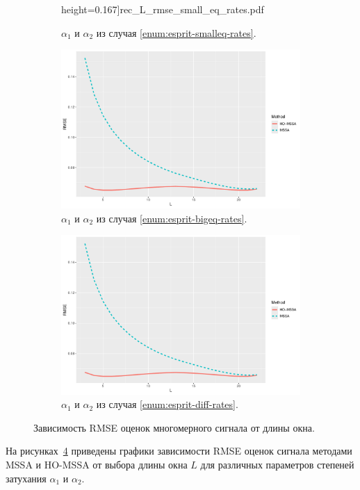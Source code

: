 \documentclass[specialist,
  substylefile=spbu_report.rtx,
subf,href,colorlinks=true, 12pt]{disser}
\theoremstyle{plain}
\theoremstyle{definition}
\theoremstyle{remark}
\begin{document}
\begin{figure}
\begin{subfigure}{0.49\linewidth}
    height=0.167\textheight]{rec_L_rmse_small_eq_rates.pdf}
    \caption{$\alpha_1$ и $\alpha_2$ из случая
    \ref{enum:esprit-smalleq-rates}.}
    \label{fig:L_rmse_smalleq_rates}
  \end{subfigure}
  \begin{subfigure}{0.49\linewidth}
    \includegraphics[width=\linewidth,
    height=0.167\textheight]{rec_L_rmse_large_eq_rates.pdf}
    \caption{$\alpha_1$ и $\alpha_2$ из случая \ref{enum:esprit-bigeq-rates}.}
    \label{fig:L_rmse_bigeq_rates}
  \end{subfigure}
  \begin{subfigure}{0.49\linewidth}
    \includegraphics[width=\linewidth,
    height=0.167\textheight]{rec_L_rmse.pdf}
    \caption{$\alpha_1$ и $\alpha_2$ из случая \ref{enum:esprit-diff-rates}.}
    \label{fig:L_rmse_diff_rates}
  \end{subfigure}
  \caption{Зависимость RMSE оценок многомерного сигнала от длины окна.}
  \label{fig:mv_L_rmse}
\end{figure}
На рисунках~\ref{fig:mv_L_rmse} приведены графики
зависимости RMSE оценок
сигнала методами MSSA и HO-MSSA от выбора длины окна $L$ для различных
параметров степеней затухания $\alpha_1$ и $\alpha_2$.
\end{document}

